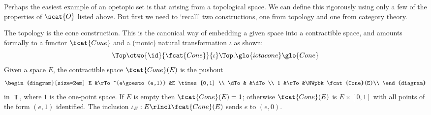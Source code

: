 %
%
%
%
%
Perhaps the easiest example of an opetopic set is that arising from a
topological space.  We can define this rigorously using only a few of the
properties of $\scat{O}$ listed above.
But first we need to `recall' two constructions, one from topology and one
from category theory.

The topology is the cone construction.  This is the canonical way of
embedding a given space into a contractible space, and amounts formally
to a functor $\fcat{Cone}$%
%
%
and a (monic) natural transformation $\iota$ as
shown:
\[
\Top
\ctwo{\id}{\fcat{Cone}}{\iota}
\Top.%
% 
\glo{iotacone}\glo{Cone}
% 
\]
Given a space $E$, the contractible space $\fcat{Cone}(E)$ is the pushout
\[
\begin{diagram}[size=2em]
E	&\rTo^{e\goesto (e,1)}	&E \times [0,1]	\\
\dTo	&			&\dTo		\\
1	&\rTo			&\NWpbk\fcat{Cone}(E)\\
\end{diagram}
\]
in $\Top$, where $1$ is the one-point space.  If $E$ is empty then
$\fcat{Cone}(E) = 1$; otherwise $\fcat{Cone}(E)$ is $E\times [0,1]$ with
all points of the form $(e,1)$ identified.  The inclusion $\iota_E: E
\rIncl \fcat{Cone}(E)$ sends $e$ to $(e,0)$.

